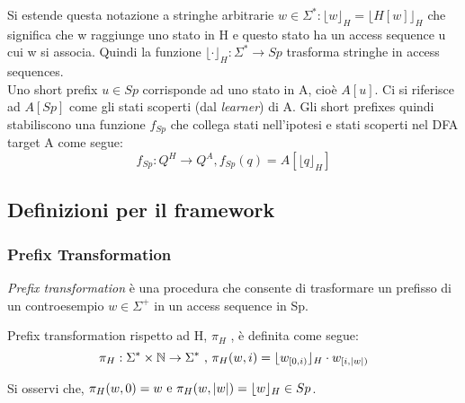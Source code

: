 Si estende questa notazione a stringhe arbitrarie $w \in \Sigma^{*} : \lfloor w \rfloor_{H} = \lfloor H[w] \rfloor_{H}$ che significa che w raggiunge uno stato in \ac{H} e questo stato ha un access sequence u cui w si associa. Quindi la funzione $\lfloor \cdot \rfloor_{H} : \Sigma^{*} \to Sp$ trasforma stringhe in access sequences.\\
Uno short prefix $u \in Sp$ corrisponde ad uno stato in A, cioè $A[u]$. Ci si riferisce ad $A[Sp]$ come gli stati scoperti (dal \textit{learner}) di A. Gli short prefixes quindi stabiliscono una funzione $f_{Sp}$ che collega stati nell'ipotesi e stati scoperti nel \ac{DFA} target A come segue:
\begin{equation*}
f_{Sp} : Q^{H} \to Q^{A} , f_{Sp}(q)=A[\lfloor q \rfloor_{H}]
\end{equation*}
\begin{comment}
Infine ,detto N l'insieme di nodi di un albero binario $\Upsilon$,si denota con o-child(n) la funzione d'utilità definita attraverso la funzione child(o,n) nella seguente maniera :
\begin{equation*}
\begin{multlined}
o-child=child : \mathbb{B} \times N  \to \{nil\} \cup N, \\
child(o,n)=\begin{cases}
n' & \parbox[t]{.6\textwidth}{se o=1 e n' è il figlio destro di n in $\Upsilon$ oppure o=0 e n' è il figlio sinistro di n in $\Upsilon$}\\
nil & \parbox[t]{.6\textwidth}{se o=1 e n non ha figli destri in $\Upsilon$ oppure o=0 e n non ha figli sinistri in $\Upsilon$}\\
\end{cases}
\end{multlined}
\end{equation*}
\end{comment}


\subsection[Def. fram.]{Definizioni per il framework}
\label{sub:fra}
\subsubsection{Prefix Transformation}
\textit{Prefix transformation} è una procedura che consente di trasformare un prefisso di un controesempio $w \in \Sigma^{+}$ in un access sequence in Sp.
\begin{definizione*}
Prefix transformation rispetto ad \ac{H}, $\pi_{H}$ , è definita come segue:
\begin{equation*}
\pi_{H} : \Sigma^{*} \times \mathbb{N} \to \Sigma^{*} \text{ , } \pi_{H}(w,i) = \lfloor w_{[0,i)} \rfloor_{H} \cdot w_{[i,\lvert w\rvert)}
\end{equation*}
\end{definizione*}
Si osservi che, $\pi_{H}(w,0)=w \text{ e } \pi_{H}(w,\lvert w\rvert)=\lfloor w \rfloor_{H} \in Sp$.

